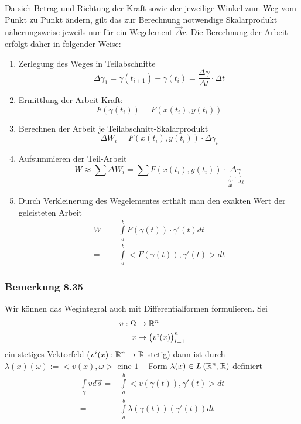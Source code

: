 Da sich Betrag und Richtung der Kraft sowie der jeweilige Winkel zum Weg vom Punkt zu Punkt ändern, gilt das zur Berechnung notwendige Skalarprodukt näherungsweise jeweils nur für ein Wegelement $\overrightarrow\Delta r$. Die Berechnung der Arbeit erfolgt daher in folgender Weise:
\begin{enumerate}[\indent a)]
\item Zerlegung des Weges in Teilabschnitte \[\Delta \gamma_1=\gamma (t_{i+1})-\gamma(t_i)=\frac{\Delta \gamma}{\Delta t}\cdot \Delta t\]
\item Ermittlung der Arbeit  Kraft: \[F\left( {\gamma \left( {{t_i}} \right)} \right) = F\left( {x\left( {{t_i}} \right),y\left( {{t_i}} \right)} \right)\]
\item Berechnen der Arbeit je Teilabschnitt-Skalarprodukt \[\Delta {W_i} = F\left( {x\left( {{t_i}} \right),y\left( {{t_i}} \right)} \right) \cdot \Delta {\gamma _i}\]
\item Aufsummieren der Teil-Arbeit \[W \approx \sum {\Delta {W_i} = \sum {F\left( {x\left( {{t_i}} \right),y\left( {{t_i}} \right)} \right)} }  \cdot \underbrace {\Delta \gamma }_{\frac{{\Delta \gamma }}{{\Delta t}} \cdot \Delta t}\]
\item Durch Verkleinerung des Wegelementes erthält man den exakten Wert der geleisteten Arbeit
\begin{align*}
W = &\int\limits_a^b {F\left( {\gamma \left( t \right)} \right)}  \cdot \gamma '\left( t \right)dt\\
 = &\int\limits_a^b { < F\left( {\gamma \left( t \right)} \right)} ,\gamma '\left( t \right) > dt
\end{align*}
\end{enumerate}
\subsubsection*{Bemerkung 8.35}
Wir können das Wegintegral auch mit Differentialformen formulieren. Sei
\begin{align*}
v:\Omega &\to\mathbb{R}^n\\
x &\to\left( v^i(x)\right)_{i=1}^n
\end{align*}
ein stetiges Vektorfeld ($v^i(x):\mathbb{R}^n\to\mathbb{R}$ stetig) dann ist durch $\lambda (x)(\omega):=< v(x),\omega >$ eine $1-$Form $\lambda (x)\in L\left( \mathbb{R}^n,\mathbb{R}\right)$ definiert
\begin{align*}
\int\limits_\gamma  {vd\vec s}  = &\int\limits_a^b { < v\left( {\gamma (t)} \right),\gamma '(t) > dt}\\
 = &\int\limits_a^b {\lambda \left( {\gamma \left( t \right)} \right)\left( {\gamma '\left( t \right)} \right)dt}
\end{align*}

